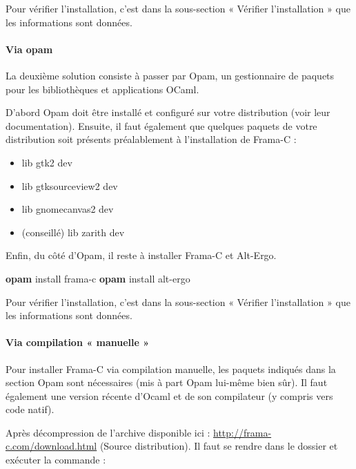 \documentclass[12pt,francais,]{scrbook}
\newenvironment{Shaded}{}{}
\newcommand{\KeywordTok}[1]{\textcolor[rgb]{0.00,0.44,0.13}{\textbf{{#1}}}}
\newcommand{\NormalTok}[1]{{#1}}
\providecommand{\tightlist}{%
  \setlength{\itemsep}{0pt}\setlength{\parskip}{0pt}}
\begin{document}
Pour vérifier l'installation, c'est dans la sous-section « Vérifier
l'installation » que les informations sont données.

\paragraph{Via opam}\label{via-opam}

La deuxième solution consiste à passer par Opam, un gestionnaire de
paquets pour les bibliothèques et applications OCaml.

D'abord Opam doit être installé et configuré sur votre distribution
(voir leur documentation). Ensuite, il faut également que quelques
paquets de votre distribution soit présents préalablement à
l'installation de Frama-C :

\begin{itemize}
\tightlist
\item
  lib gtk2 dev
\item
  lib gtksourceview2 dev
\item
  lib gnomecanvas2 dev
\item
  (conseillé) lib zarith dev
\end{itemize}

Enfin, du côté d'Opam, il reste à installer Frama-C et Alt-Ergo.

\begin{footnotesize}\begin{Shaded}
\begin{Highlighting}[]
\KeywordTok{opam} \NormalTok{install frama-c}
\KeywordTok{opam} \NormalTok{install alt-ergo}
\end{Highlighting}
\end{Shaded}\end{footnotesize}

Pour vérifier l'installation, c'est dans la sous-section « Vérifier
l'installation » que les informations sont données.

\paragraph{Via compilation « manuelle »}\label{via-compilation-manuelle}

Pour installer Frama-C via compilation manuelle, les paquets indiqués
dans la section Opam sont nécessaires (mis à part Opam lui-même bien
sûr). Il faut également une version récente d'Ocaml et de son
compilateur (y compris vers code natif).

Après décompression de l'archive disponible ici :
\url{http://frama-c.com/download.html} (Source distribution). Il faut se
rendre dans le dossier et exécuter la commande :
\end{document}
